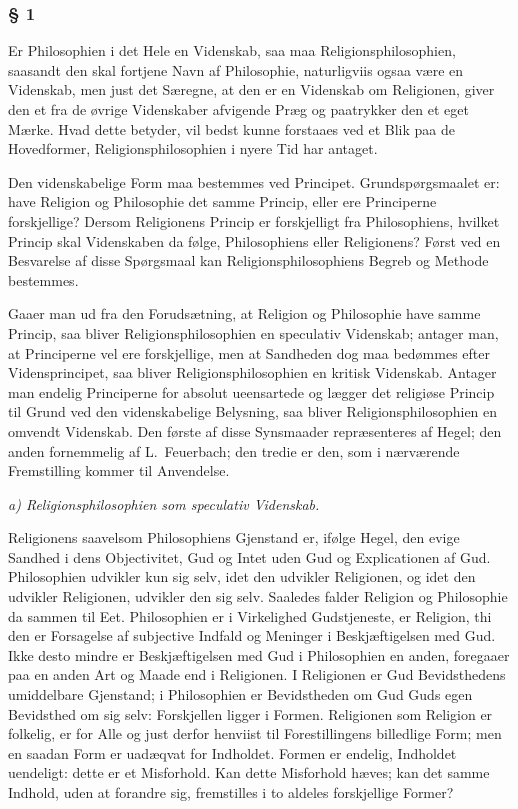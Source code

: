 \documentclass[12pt,a4paper]{article}
\begin{document}
\subsubsection*{§ 1}

Er Philosophien i det Hele en Videnskab, saa maa
Religionsphilosophien, saasandt den skal fortjene Navn af
Philosophie, naturligviis ogsaa være en Videnskab, men just
det Særegne, at den er en Videnskab om Religionen, giver den
et fra de øvrige Videnskaber afvigende Præg og paatrykker
den et eget Mærke. Hvad dette betyder, vil bedst kunne
forstaaes ved et Blik paa de Hovedformer,
Religionsphilosophien i nyere Tid har antaget.

Den videnskabelige Form maa bestemmes ved Principet.
Grundspørgsmaalet er: have Religion og Philosophie det samme
Princip, eller ere Principerne forskjellige? Dersom Religionens
Princip er forskjelligt fra Philosophiens, hvilket Princip skal
Videnskaben da følge, Philosophiens eller Religionens? Først
ved en Besvarelse af disse Spørgsmaal kan
Religionsphilosophiens Begreb og Methode bestemmes.

Gaaer man ud fra den Forudsætning, at Religion og Philosophie
have samme Princip, saa bliver Religionsphilosophien en
speculativ Videnskab; antager man, at Principerne vel ere
forskjellige, men at Sandheden dog maa bedømmes efter
Vidensprincipet, saa bliver Religionsphilosophien en kritisk
Videnskab. Antager man endelig Principerne for absolut
ueensartede og lægger det religiøse Princip til Grund ved den
videnskabelige Belysning, saa bliver Religionsphilosophien en
omvendt Videnskab. Den første af disse Synsmaader
repræsenteres af Hegel; den anden fornemmelig af
L.\ Feuerbach; den tredie er den, som i nærværende
Fremstilling kommer til Anvendelse.

\medskip

\noindent\textit{a) Religionsphilosophien som speculativ Videnskab.}

\medskip

Religionens saavelsom Philosophiens Gjenstand er, ifølge
Hegel, den evige Sandhed i dens Objectivitet, Gud og Intet
uden Gud og Explicationen af Gud. Philosophien udvikler kun
sig selv, idet den udvikler Religionen, og idet den udvikler
Religionen, udvikler den sig selv. Saaledes falder Religion og
Philosophie da sammen til Eet. Philosophien er i Virkelighed
Gudstjeneste, er Religion, thi den er Forsagelse af subjective
Indfald og Meninger i Beskjæftigelsen med Gud. Ikke desto
mindre er Beskjæftigelsen med Gud i Philosophien en anden,
foregaaer paa en anden Art og Maade end i Religionen. I
Religionen er Gud Bevidsthedens umiddelbare Gjenstand; i
Philosophien er Bevidstheden om Gud Guds egen Bevidsthed om
sig selv: Forskjellen ligger i Formen. Religionen som Religion
er folkelig, er for Alle og just derfor henviist til
Forestillingens billedlige Form; men en saadan Form er
uadæqvat for Indholdet. Formen er endelig, Indholdet
uendeligt: dette er et Misforhold. Kan dette Misforhold hæves;
kan det samme Indhold, uden at forandre sig, fremstilles i to
aldeles forskjellige Former?
\end{document}
